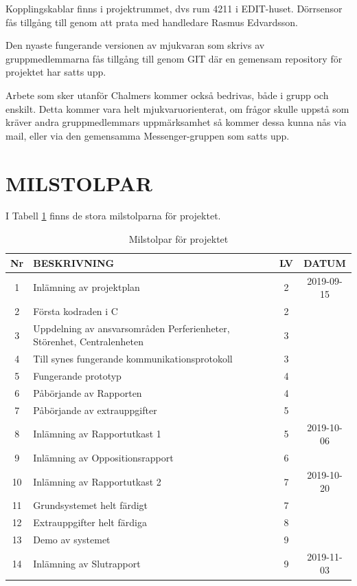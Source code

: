 \documentclass[a4paper]{article}
\begin{document}
Kopplingskablar finns i projektrummet, dvs rum 4211 i EDIT-huset. Dörrsensor fås tillgång till genom att prata med handledare Rasmus Edvardsson.

Den nyaste fungerande versionen av mjukvaran som skrivs av gruppmedlemmarna fås tillgång till genom GIT där en gemensam repository för projektet har satts upp.

Arbete som sker utanför Chalmers kommer också bedrivas, både i grupp och enskilt. Detta kommer vara helt mjukvaruorienterat, om frågor skulle uppstå som kräver andra gruppmedlemmars uppmärksamhet så kommer dessa kunna nås via mail, eller via den gemensamma Messenger-gruppen som satts upp.

\section{MILSTOLPAR}
\label{sec:milstolpar}

I Tabell \ref{tab:milstolpar} finns de stora milstolparna för projektet.

	\begin{table}[htbp]
	\begin{tabular}{|c|l|c|c|}
		\hline
		Nr & BESKRIVNING & LV & DATUM \\ \hline \hline

		1 & Inlämning av projektplan & 2 & 2019-09-15 \\ \hline
		2 & Första kodraden i C & 2 & \\ \hline
		3 & Uppdelning av ansvarsområden Perferienheter, Störenhet, Centralenheten & 3 & \\ \hline
		4 & Till synes fungerande kommunikationsprotokoll & 3 & \\ \hline
		5 & Fungerande prototyp & 4 & \\ \hline
		6 & Påbörjande av Rapporten & 4 & \\ \hline
		7 & Påbörjande av extrauppgifter & 5 & \\ \hline
		8 & Inlämning av Rapportutkast 1 & 5 & 2019-10-06 \\ \hline
		9 & Inlämning av Oppositionsrapport &6 & \\ \hline
		10 & Inlämning av Rapportutkast 2 & 7 & 2019-10-20 \\ \hline
		11 & Grundsystemet helt färdigt & 7 & \\ \hline
		12 & Extrauppgifter helt färdiga & 8 & \\ \hline
		13 & Demo av systemet & 9 & \\ \hline
		14 & Inlämning av Slutrapport & 9 & 2019-11-03 \\ \hline
	\end{tabular}
	\caption{Milstolpar för projektet}
	\label{tab:milstolpar}
\end{table}
\end{document}
